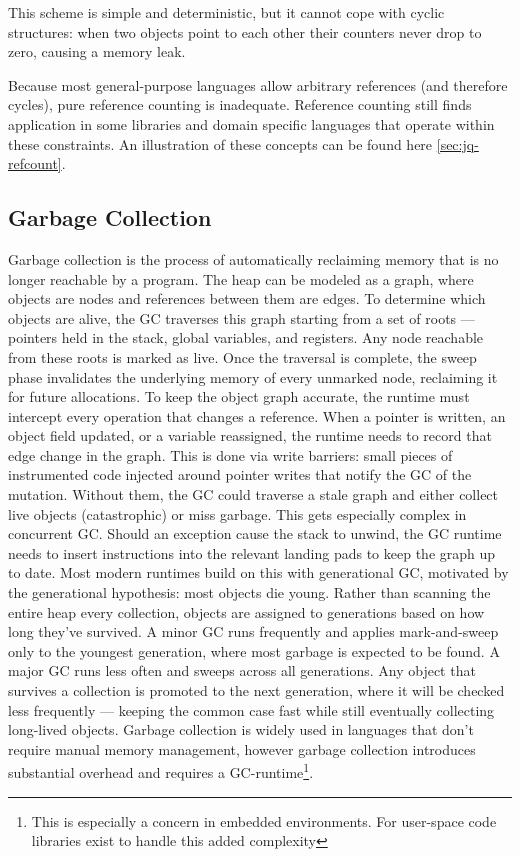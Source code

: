 This scheme is simple and deterministic, but it cannot cope with cyclic structures: when two objects point to each other their counters never drop to zero, causing a memory leak.

Because most general-purpose languages allow arbitrary references (and therefore cycles), pure reference counting is inadequate. Reference counting still finds application in some libraries and domain specific languages that operate within these constraints. An illustration of these concepts can be found here \ref{sec:jq-refcount}.

\subsection{Garbage Collection}

Garbage collection is the process of automatically reclaiming memory that is no longer reachable by a program. The heap can be modeled as a graph, where objects are nodes and references between them are edges. To determine which objects are alive, the GC traverses this graph starting from a set of roots — pointers held in the stack, global variables, and registers. Any node reachable from these roots is marked as live. Once the traversal is complete, the sweep phase invalidates the underlying memory of every unmarked node, reclaiming it for future allocations.
To keep the object graph accurate, the runtime must intercept every operation that changes a reference. When a pointer is written, an object field updated, or a variable reassigned, the runtime needs to record that edge change in the graph. This is done via write barriers: small pieces of instrumented code injected around pointer writes that notify the GC of the mutation. Without them, the GC could traverse a stale graph and either collect live objects (catastrophic) or miss garbage. This gets especially complex in concurrent GC. Should an exception cause the stack to unwind, the GC runtime needs to insert instructions into the relevant landing pads to keep the graph up to date.
Most modern runtimes build on this with generational GC, motivated by the generational hypothesis: most objects die young. Rather than scanning the entire heap every collection, objects are assigned to generations based on how long they've survived. A minor GC runs frequently and applies mark-and-sweep only to the youngest generation, where most garbage is expected to be found. A major GC runs less often and sweeps across all generations. Any object that survives a collection is promoted to the next generation, where it will be checked less frequently — keeping the common case fast while still eventually collecting long-lived objects.
Garbage collection is widely used in languages that don't require manual memory management, however garbage collection introduces substantial overhead and requires a GC-runtime\footnote{This is especially a concern in embedded environments. For user-space code libraries exist to handle this added complexity}\cite{ungar1984generation}.

